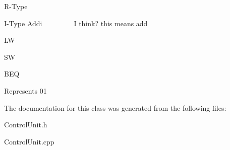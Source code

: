 R-\/\+Type

I-\/\+Type Addi ~\newline
~\newline
~\newline
~\newline
~\newline
 I think? this means add

LW

SW

B\+EQ

Represents 01 

The documentation for this class was generated from the following files\+:\begin{DoxyCompactItemize}
\item 
Control\+Unit.\+h\item 
Control\+Unit.\+cpp\end{DoxyCompactItemize}
